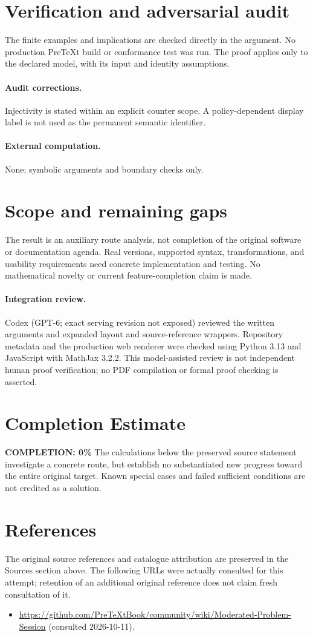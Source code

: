 \documentclass[11pt]{article}
\begin{document}
\section{Verification and adversarial audit}
The finite examples and implications are checked directly in the argument. No production PreTeXt build or conformance test was run. The proof applies only to the declared model, with its input and identity assumptions.
\paragraph{Audit corrections.} Injectivity is stated within an explicit counter scope. A policy-dependent display label is not used as the permanent semantic identifier.
\paragraph{External computation.} None; symbolic arguments and boundary checks only.
\section{Scope and remaining gaps}
The result is an auxiliary route analysis, not completion of the original software or documentation agenda. Real versions, supported syntax, transformations, and usability requirements need concrete implementation and testing. No mathematical novelty or current feature-completion claim is made.
\paragraph{Integration review.} Codex (GPT-6; exact serving revision not exposed) reviewed the written arguments and expanded layout and source-reference wrappers. Repository metadata and the production web renderer were checked using Python 3.13 and JavaScript with MathJax 3.2.2. This model-assisted review is not independent human proof verification; no PDF compilation or formal proof checking is asserted.

\section{Completion Estimate}
\noindent\textbf{COMPLETION: 0\%}
The calculations below the preserved source statement investigate a concrete route,
but establish no substantiated new progress toward the entire original target.
Known special cases and failed sufficient conditions are not credited as a solution.
\section{References}
The original source references and catalogue attribution are preserved in the
Sources section above. The following URLs were actually consulted for this attempt;
retention of an additional original reference does not claim fresh consultation of it.
\begin{itemize}
\item \url{https://github.com/PreTeXtBook/community/wiki/Moderated-Problem-Session} (consulted 2026-10-11). 
\end{itemize}
\end{document}
